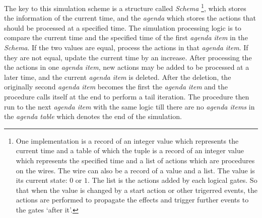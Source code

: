 \documentclass[12pt,a4paper]{report}
\begin{document}
        The key to this simulation scheme is a structure called \emph{Schema} \footnote{One implementation is a record of an integer value which represents the current time and a table of which the tuple is a record of an integer value which represents the specified time and a list of actions which are procedures on the wires. The wire can also be a record of a value and a list. The value is its current state: $0$ or $1$. The list is the actions added by each logical gates. So that when the value is changed by a start action or other trigerred events, the actions are performed to propagate the effects and trigger further events to the gates `after it'.}, which stores the information of the current time, and the \emph{agenda} which stores the actions that should be processed at a specified time. The simulation processing logic is to compare the current time and the specified time of the first \emph{agenda item} in the \emph{Schema}. If the two values are equal, process the actions in that \emph{agenda item}. If they are not equal, update the current time by an increase. After processing the the actions in one \emph{agenda item}, new actions may be added to be processed at a later time, and the current \emph{agenda item} is deleted. After the deletion, the originally second \emph{agenda item} becomes the first the \emph{agenda item} and the procedure calls itself at the end to perform a tail iteration. The procedure then run to the next \emph{agenda item} with the same logic till there are no \emph{agenda items} in the \emph{agenda table} which denotes the end of the simulation.
\end{document}
